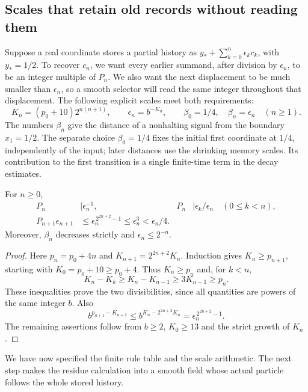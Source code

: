 \subsection{Scales that retain old records without reading them}

Suppose a real coordinate stores a partial history as
$y_*+\sum_{k=0}^n\epsilon_kc_k$, with $y_*=1/2$.
To recover $c_n$, we want every earlier summand, after division by
$\epsilon_n$, to be an integer multiple of $P_n$.  We also want the
next displacement to be much smaller than $\epsilon_n$, so a smooth
selector will read the same integer throughout that displacement.
The following explicit scales meet both requirements:
\begin{equation}\label{eq:lattice-scales}
 K_n=(p_0+10)2^{n(n+1)},\qquad
 \epsilon_n=b^{-K_n},\qquad
 \beta_0=1/4,\quad \beta_n=\epsilon_n\quad(n\ge1).
\end{equation}
The numbers $\beta_n$ give the distance of a nonhalting signal from
the boundary $x_1=1/2$. The separate choice $\beta_0=1/4$ fixes the
initial first coordinate at $1/4$, independently of the input; later
distances use the shrinking memory scales. Its contribution to the
first transition is a single finite-time term in the decay estimates.

\begin{lemma}\label{lem:lattice-scales}
For $n\ge0$,
\begin{align}
 P_n&\mid\epsilon_n^{-1},&
 P_n&\mid\epsilon_k/\epsilon_n\quad(0\le k<n),
 \label{eq:lattice-divisibility}\\
 P_{n+1}\epsilon_{n+1}
 &\le\epsilon_n^{\,2^{2n+2}-1}
 \le\epsilon_n^3<\epsilon_n/4.
 \label{eq:lattice-plateau-bound}
\end{align}
Moreover, $\beta_n$ decreases strictly and $\epsilon_n\le2^{-n}$.
\end{lemma}
\begin{proof}
Here $p_n=p_0+4n$ and $K_{n+1}=2^{2n+2}K_n$.
Induction gives $K_n\ge p_{n+1}$, starting with
$K_0=p_0+10\ge p_0+4$.  Thus $K_n\ge p_n$ and, for $k<n$,
\[
 K_n-K_k\ge K_n-K_{n-1}\ge3K_{n-1}\ge p_n.
\]
These inequalities prove the two divisibilities, since all quantities
are powers of the same integer $b$.  Also
\[
 b^{p_{n+1}-K_{n+1}}
 \le b^{K_n-2^{2n+2}K_n}
 =\epsilon_n^{\,2^{2n+2}-1}.
\]
The remaining assertions follow from $b\ge2$, $K_0\ge13$ and the
strict growth of $K_n$.
\end{proof}

We have now specified the finite rule table and the scale arithmetic.
The next step makes the residue calculation into a smooth field whose
actual particle follows the whole stored history.

